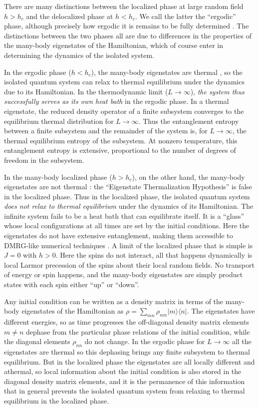 \documentclass[letterpaper, twocolumn,superscriptaddress, showpacs,preprintnumbers,amsmath,amssymb]{revtex4}
\begin{document}
There are many distinctions between the localized phase at large random field $h>h_c$
and the delocalized phase at $h<h_c$.
We call the latter the ``ergodic'' phase, although precisely how ergodic it is remains to be fully determined \cite{biroli}.
The distinctions between the two phases all are due to differences in the properties of the many-body eigenstates of the Hamiltonian,
which of course enter in determining the dynamics of the isolated system.

In the ergodic phase ($h<h_c$), the many-body eigenstates are thermal \cite{deutsch,sred,tasaki,rdo},
so the isolated quantum system can relax to thermal equilibrium under the dynamics due to its Hamiltonian.
In the thermodynamic limit ($L\rightarrow\infty$), {\it the system thus successfully serves as its own heat bath} in the ergodic phase.
In a thermal eigenstate, the reduced density operator of a finite subsystem converges to the equilibrium thermal distribution for $L\rightarrow\infty$.
Thus the entanglement entropy between a finite subsystem and the remainder of the system is,
for $L\rightarrow\infty$, the thermal equilibrium entropy of the subsystem.
At nonzero temperature, this entanglement entropy is extensive,
proportional to the number of degrees of freedom in the subsystem.

In the many-body localized phase ($h>h_c$), on the other hand, the many-body eigenstates are not thermal \cite{baa}:
the ``Eigenstate Thermalization Hypothesis'' \cite{deutsch,sred,tasaki,rdo} is false in the localized phase.
Thus in the localized phase, the isolated quantum system {\it does not relax to thermal equilibrium} under the dynamics of its Hamiltonian.
The infinite system fails to be a heat bath that can equilibrate itself.
It is a ``glass'' whose local configurations at all times are set by the initial conditions.
Here the eigenstates do not have extensive entanglement, making them accessible to DMRG-like numerical techniques \cite{zpp}.
A limit of the localized phase that is simple is $J=0$ with $h>0$.  Here the spins do not interact,
all that happens dynamically is local Larmor precession of the spins about their local random fields.  No transport
of energy or spin happens, and the many-body eigenstates are simply product states with each spin either ``up'' or ``down''.

Any initial condition can be written as a density matrix in terms of the many-body
eigenstates of the Hamiltonian as $\rho=\sum_{mn}\rho_{mn}|m\rangle\langle n|$.  The eigenstates have different energies,
so as time progresses the off-diagonal density matrix elements $m\neq n$ dephase from the particular phase
relations of the initial condition, while the diagonal elements $\rho_{nn}$ do not change. %
In the ergodic phase for $L\rightarrow\infty$ all the eigenstates are thermal so this
dephasing brings any finite subsystem to thermal equilibrium.  But in the localized phase the eigenstates are all locally
different and athermal, so local information about the initial condition is also stored in the diagonal density
matrix elements, and it is the permanence of this information that in general prevents the isolated quantum system from relaxing to
thermal equilibrium in the localized phase.
\end{document}
